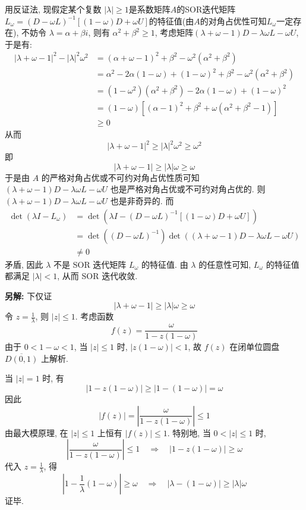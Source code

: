 \documentclass[12pt, answers]{exam}     %
\newcommand{\anothersolution}{\par\noindent\textbf{另解:}}
\begin{document}
\begin{questions}
\begin{solution}
用反证法, 现假定某个复数 \( |\lambda| \geq 1 \)是系数矩阵\( A \)的SOR迭代矩阵\( L_{\omega} = (D - \omega L)^{-1} [(1 - \omega)D + \omega U] \)的特征值(由\( A \)的对角占优性可知\(L_{\omega}\)一定存在), 
不妨令 \( \lambda = \alpha + \beta i \), 则有 \( \alpha^2 + \beta^2 \geq 1 \), 
考虑矩阵\( (\lambda + \omega - 1)D - \lambda \omega L - \omega U \), 于是有:
\begin{align*}
|\lambda + \omega - 1|^2 - |\lambda|^2 \omega^2 &= (\alpha + \omega - 1)^2 + \beta^2 - \omega^2 (\alpha^2 + \beta^2) \\
&= \alpha^2 - 2\alpha (1 - \omega) + (1 - \omega)^2 + \beta^2 - \omega^2 (\alpha^2 + \beta^2) \\
&= (1 - \omega^2)(\alpha^2 + \beta^2) - 2\alpha (1 - \omega) + (1 - \omega)^2 \\
&= (1 - \omega)\left[(\alpha - 1)^2 + \beta^2 + \omega (\alpha^2 + \beta^2 - 1)\right] \\
&\geq 0
\end{align*}
从而
\[
|\lambda + \omega - 1|^2 \geq |\lambda|^2 \omega^2 \geq \omega^2
\]
即
\[
|\lambda + \omega - 1| \geq |\lambda| \omega \geq \omega
\]
于是由 \( A \) 的严格对角占优或不可约对角占优性质可知 \( (\lambda + \omega - 1)D - \lambda \omega L - \omega U \) 也是严格对角占优或不可约对角占优的. 则\( (\lambda + \omega - 1)D - \lambda \omega L - \omega U \) 也是非奇异的. 
而
\begin{align*}
\det(\lambda I - L_{\omega}) &= \det\left(\lambda I - (D - \omega L)^{-1} [(1 - \omega)D + \omega U]\right) \\
&= \det\left((D - \omega L)^{-1}\right) \det\left((\lambda + \omega - 1)D - \lambda \omega L - \omega U\right) \\
&\neq 0
\end{align*}
矛盾, 因此 \( \lambda \) 不是 SOR 迭代矩阵 \( L_{\omega} \) 的特征值. 由 \( \lambda \) 的任意性可知, \( L_{\omega} \) 的特征值都满足 \( |\lambda| < 1 \), 从而 SOR 迭代收敛. 
\anothersolution{}
下仅证
\[
|\lambda + \omega - 1| \geq |\lambda| \omega \geq \omega
\]
令 \( z = \frac{1}{\lambda} \), 则 \( |z| \leq 1 \). 考虑函数
\[
f(z) = \frac{\omega}{1 - z(1 - \omega)}
\]
由于 \( 0 < 1 - \omega < 1 \), 当 \( |z| \leq 1 \) 时, \( |z(1 - \omega)| < 1 \), 故 \( f(z) \) 在闭单位圆盘 \( \overline{D(0,1)} \) 上解析.

当 \( |z| = 1 \) 时, 有
\[
|1 - z(1 - \omega)| \geq |1 - (1 - \omega)| = \omega
\]
因此
\[
|f(z)| = \left| \frac{\omega}{1 - z(1 - \omega)} \right| \leq 1
\]
由最大模原理, 在 \( |z| \leq 1 \) 上恒有 \( |f(z)| \leq 1 \). 特别地, 当 \( 0 < |z| \leq 1 \) 时,
\[
\left| \frac{\omega}{1 - z(1 - \omega)} \right| \leq 1 \quad \Rightarrow \quad |1 - z(1 - \omega)| \geq \omega
\]
代入 \( z = \frac{1}{\lambda} \), 得
\[
\left| 1 - \frac{1}{\lambda}(1 - \omega) \right| \geq \omega \quad \Rightarrow \quad |\lambda - (1 - \omega)| \geq |\lambda| \omega
\]
证毕.
\end{solution}



\end{questions}
\end{document}
